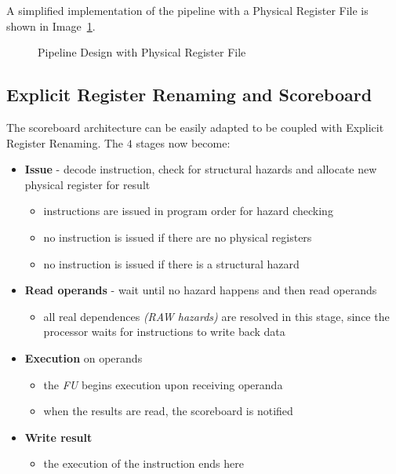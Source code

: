 \documentclass[english]{article}
\begin{document}
A simplified implementation of the pipeline with a Physical Register File is shown in Image~\ref{fig:pipeline-design-with-physical-register-file}.

\begin{figure}[htbp]
  \bigskip
  \centering
  \caption{Pipeline Design with Physical Register File}
  \label{fig:pipeline-design-with-physical-register-file}
  \bigskip
\end{figure}

\subsection{Explicit Register Renaming and Scoreboard}

The scoreboard architecture can be easily adapted to be coupled with Explicit Register Renaming.
The \(4\) stages now become:

\begin{itemize}
  \item \textbf{Issue} - decode instruction, check for structural hazards and allocate new physical register for result
        \begin{itemize}
          \item instructions are issued in program order for hazard checking
          \item no instruction is issued if there are no physical registers
          \item no instruction is issued if there is a structural hazard
        \end{itemize}
  \item \textbf{Read operands} - wait until no hazard happens and then read operands
        \begin{itemize}
          \item all real dependences \textit{(RAW hazards)}  are resolved in this stage, since the processor waits for instructions to write back data
        \end{itemize}
  \item \textbf{Execution} on operands
        \begin{itemize}
          \item the \textit{FU} begins execution upon receiving operanda
          \item when the results are read, the scoreboard is notified
        \end{itemize}
  \item \textbf{Write result}
        \begin{itemize}
          \item the execution of the instruction ends here
        \end{itemize}
\end{itemize}
\end{document}
